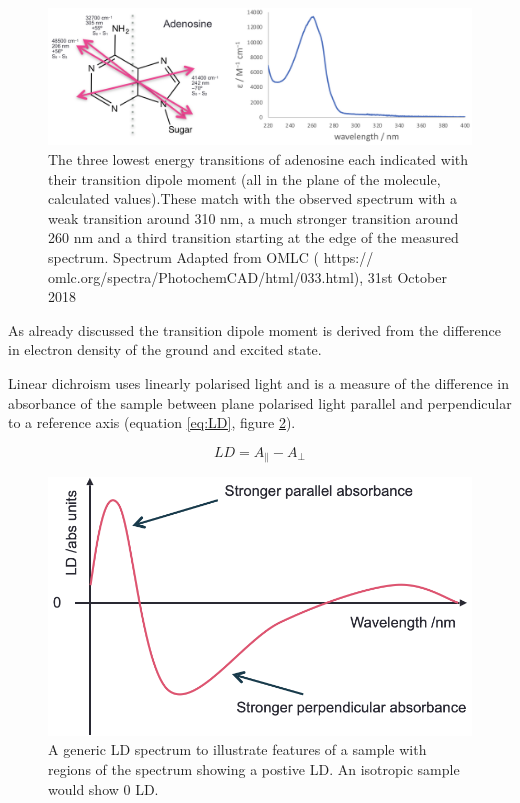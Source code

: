 \documentclass[
]{book}
\begin{document}
\begin{figure}

{\centering \includegraphics[width=1\linewidth]{images/adenosine} 

}

\caption{The three lowest energy transitions of adenosine each indicated with their transition dipole moment (all in the plane of the molecule, calculated values).These match with the observed spectrum with a weak transition around 310 nm, a much stronger transition around 260 nm and a third transition starting at the edge of the measured spectrum. Spectrum Adapted from OMLC ( https:// omlc.org/spectra/PhotochemCAD/html/033.html), 31st October 2018}\label{fig:adenosine}
\end{figure}

As already discussed the transition dipole moment is derived from the difference in electron density of the ground and excited state.

Linear dichroism uses linearly polarised light and is a measure of the difference in absorbance of the sample between plane polarised light parallel and perpendicular to a reference axis (equation \eqref{eq:LD}, figure \ref{fig:LD}).

\begin{equation}
LD = A_{\parallel} - A_{\perp}
\label{eq:LD}
\end{equation}

\begin{figure}

{\centering \includegraphics[width=0.6\linewidth]{images/LD} 

}

\caption{A generic LD spectrum to illustrate features of a sample with regions of the spectrum showing a postive LD. An isotropic sample would show 0 LD.}\label{fig:LD}
\end{figure}

  
\end{document}
